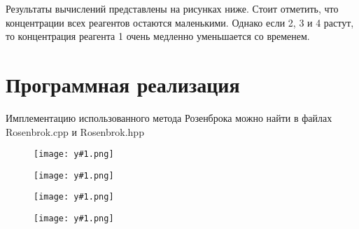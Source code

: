 \documentclass[a4paper,12pt]{article} %
\begin{document}
Результаты вычислений представлены на рисунках ниже. Стоит отметить, что концентрации всех реагентов остаются маленькими. Однако если 2, 3 и 4 растут, то концентрация реагента 1 очень медленно уменьшается со временем.

\section*{Программная реализация}

Имплементацию использованного метода Розенброка можно найти в файлах Rosenbrok.cpp и Rosenbrok.hpp

\newcommand{\plot}[1]{
\begin{figure}[H]
	\texttt{[image: y\#1.png]}
\end{figure}
}

\plot{1}
\plot{2}
\plot{3}
\plot{4}
\end{document}
